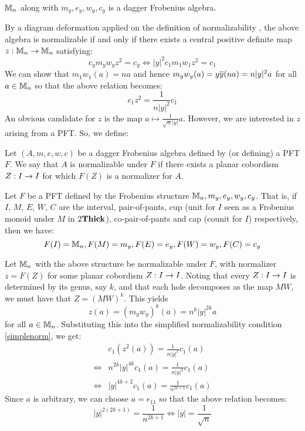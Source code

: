 \begin{thm}
$\mathbb{M}_n$ along with $m_y, e_y, w_y, c_y$ is a dagger Frobenius algebra.
\end{thm}

By a diagram deformation applied on the definition of normalizability
\cite[9]{CatQChan}, the above algebra is normalizable if and only if there
exists a central positive definite map $z : \mathbb{M}_n \rightarrow \mathbb{M}_n$ satisfying:
\[
  c_ym_yw_yz^2 = c_y \iff |y|^2c_1m_1w_1z^2 = c_1
\]
We can show that $m_1w_1(a) = na$ and hence $m_yw_y(a) = y\overline{y} (na)
= n|y|^2 a$ for all $a \in \mathbb{M}_n$ so that the above relation becomes:
\begin{equation}\label{simplenorm}
  c_1z^2 = \frac{1}{n|y|^2}c_1
\end{equation}
An obvious candidate for $z$ is the map $a \mapsto \frac{1}{\sqrt{n}|y|} a$.
However, we are interested in $z$ arising from a PFT. So, we define:
\begin{defn}
Let $(A, m, e, w, c)$ be a dagger Frobenius algebra defined by (or defining) a
PFT $F$. We say that $A$ is normalizable under $F$ if there exists a planar
cobordism $Z : I \rightarrow I$ for which $F(Z)$ is a normalizer for $A$.
\end{defn}

Let $F$ be a PFT defined by the Frobenius structure $\mathbb{M}_n, m_y, e_y, w_y, c_y$.
That is, if $I$, $M$, $E$, $W$, $C$ are the interval, pair-of-pants, cup (unit
for $I$ seen as a Frobenius monoid under $M$ in $2\mathbf{Thick}$), co-pair-of-pants and
cap (counit for $I$) respectively, then we have:
\[
  F(I) = \mathbb{M}_n, F(M) = m_y, F(E) = e_y, F(W) = w_y, F(C) = c_y
\]

Let $\mathbb{M}_{n}$ with the above structure be normalizable under $F$, with normalizer
$z = F(Z)$ for some planar cobordism $Z : I \rightarrow I$. Noting that every
$Z : I \rightarrow I$ is determined by its genus, say $k$, and that each hole
decomposes as the map $MW$, we must have that $Z = (MW)^k$. This yields
\[
  z(a) = (m_yw_y)^k(a) = n^{k}|y|^{2k}a
\]
for all $a \in \mathbb{M}_n$. Substituting this into the simplified normalizability
condition \eqref{simplenorm}, we get:
\begin{align*}
       & c_1(z^2(a)) = \frac{1}{n|y|^2} c_1(a)\\
  \iff & n^{2k}|y|^{4k} c_1(a) = \frac{1}{n|y|^2} c_1(a)\\
  \iff & |y|^{4k + 2}c_1(a) = \frac{1}{n^{2k + 1}} c_1(a)
\end{align*}
Since $a$ is arbitrary, we can choose $a = e_{11}$ so that the above relation
becomes:
\[
  |y|^{2(2k + 1)} = \frac{1}{n^{2k + 1}}
  \iff |y| = \frac{1}{\sqrt{n}}
\]

